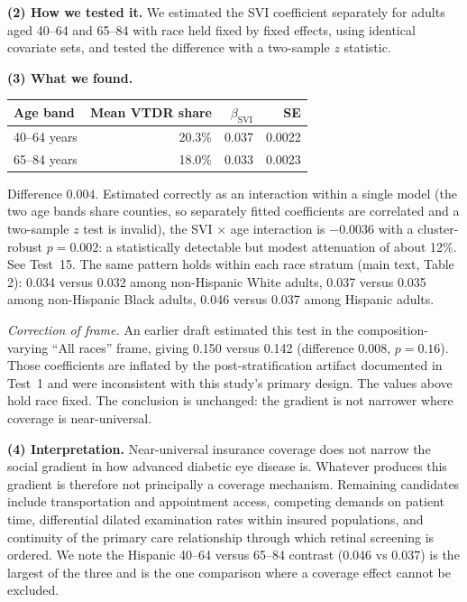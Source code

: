 \documentclass[11pt]{article}
\newcommand{\tpart}[1]{\medskip\noindent\textbf{#1}\quad}
\begin{document}
\tpart{(2) How we tested it.}
We estimated the SVI coefficient separately for adults aged 40--64 and 65--84
with race held fixed by fixed effects, using identical covariate sets, and
tested the difference with a two-sample $z$ statistic.

\tpart{(3) What we found.}
\begin{center}
\begin{tabular}{lrrr}
\toprule
Age band & Mean VTDR share & $\beta_{\mathrm{SVI}}$ & SE \\
\midrule
40--64 years & 20.3\% & 0.037 & 0.0022 \\
65--84 years & 18.0\% & 0.033 & 0.0023 \\
\bottomrule
\end{tabular}
\end{center}
Difference $0.004$. Estimated correctly as an interaction within a single model
(the two age bands share counties, so separately fitted coefficients are
correlated and a two-sample $z$ test is invalid), the SVI $\times$ age
interaction is $-0.0036$ with a cluster-robust $p = 0.002$: a statistically
detectable but modest attenuation of about 12\%. See Test~15. The same pattern holds within each
race stratum (main text, Table 2): 0.034 versus 0.032 among non-Hispanic White
adults, 0.037 versus 0.035 among non-Hispanic Black adults, 0.046 versus 0.037
among Hispanic adults.

\medskip
\noindent\emph{Correction of frame.} An earlier draft estimated this test in the
composition-varying ``All races'' frame, giving 0.150 versus 0.142 (difference
0.008, $p = 0.16$). Those coefficients are inflated by the post-stratification
artifact documented in Test~1 and were inconsistent with this study's primary
design. The values above hold race fixed. The conclusion is unchanged: the
gradient is not narrower where coverage is near-universal.

\tpart{(4) Interpretation.}
Near-universal insurance coverage does not narrow the social gradient in how
advanced diabetic eye disease is. Whatever produces this gradient is therefore
not principally a coverage mechanism. Remaining candidates include
transportation and appointment access, competing demands on patient time,
differential dilated examination rates within insured populations, and
continuity of the primary care relationship through which retinal screening is
ordered. We note the Hispanic 40--64 versus 65--84 contrast (0.046 vs 0.037) is
the largest of the three and is the one comparison where a coverage effect
cannot be excluded.
\end{document}
